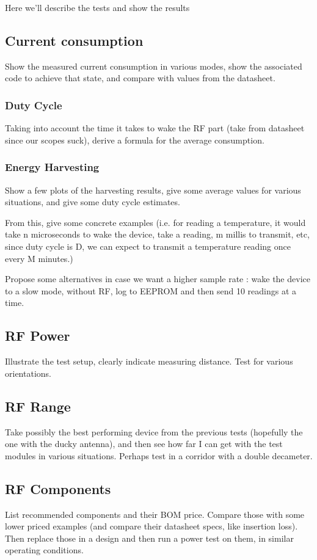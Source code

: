 Here we'll describe the tests and show the results

\subsection{Current consumption}

Show the measured current consumption in various modes, show the associated code
to achieve that state, and compare with values from the datasheet.

\subsubsection{Duty Cycle}

Taking into account the time it takes to wake the RF part (take from datasheet
since our scopes suck), derive a formula for the average consumption.

\subsubsection{Energy Harvesting}

Show a few plots of the harvesting results, give some average values for various
situations, and give some duty cycle estimates.

From this, give some concrete examples (i.e. for reading a temperature, it would
take n microseconds to wake the device, take a reading, m millis to transmit,
etc, since duty cycle is D, we can expect to transmit a temperature reading once
every M minutes.)

Propose some alternatives in case we want a higher sample rate : wake the device
to a slow mode, without RF, log to EEPROM and then send 10 readings at a time.

\subsection{RF Power}

Illustrate the test setup, clearly indicate measuring distance. Test for various
orientations.

\subsection{RF Range}

Take possibly the best performing device from the previous tests (hopefully the
one with the ducky antenna), and then see how far I can get with the test
modules in various situations. Perhaps test in a corridor with a double
decameter.

\subsection{RF Components}

List recommended components and their BOM price. Compare those with some lower
priced examples (and compare their datasheet specs, like insertion loss). Then
replace those in a design and then run a power test on them, in similar
operating conditions.



